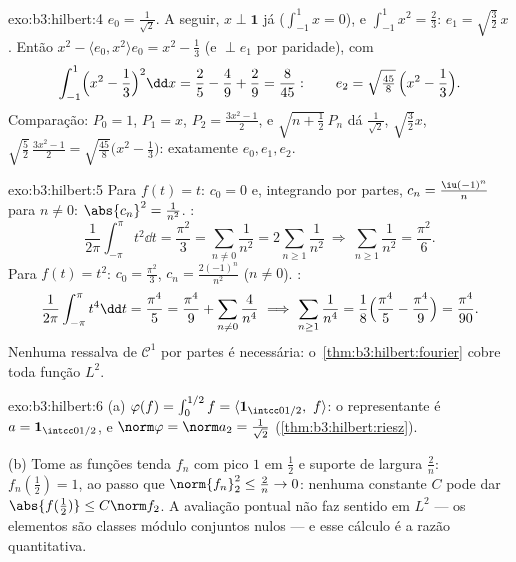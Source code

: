 \begin{solution}{exo:b3:hilbert:4}
$e_0 = \frac1{\sqrt2}$. A seguir, $x \perp \mathbf 1$ já
($\int_{-1}^1x = 0$), e $\int_{-1}^1x^2 = \frac23$: $e_1 =
\sqrt{\tfrac32}\,x$. Então $x^2 - \langle e_0, x^2\rangle e_0 =
x^2 - \frac13$ (e $\perp e_1$ por paridade), com
\[
\int_{-1}^1\Bigl(x^2 - \frac13\Bigr)^2\dd x = \frac25 -
\frac49 + \frac29 = \frac{8}{45}:
\qquad e_2 = \sqrt{\tfrac{45}8}\,\Bigl(x^2 - \frac13\Bigr).
\]
Comparação: $P_0 = 1$, $P_1 = x$, $P_2 = \frac{3x^2 - 1}2$, e
$\sqrt{n + \tfrac12}\,P_n$ dá $\frac1{\sqrt2}$,
$\sqrt{\frac32}x$, $\sqrt{\frac52}\,\frac{3x^2-1}2 =
\sqrt{\frac{45}8}\bigl(x^2 - \frac13\bigr)$: exatamente $e_0, e_1,
e_2$.
\end{solution}

\begin{solution}{exo:b3:hilbert:5}
Para $f(t) = t$: $c_0 = 0$ e, integrando por partes, $c_n =
\frac{\iu(-1)^n}{n}$ para $n \neq 0$: $\abs{c_n}^2 =
\frac1{n^2}$. :
\[
\frac1{2\pi}\int_{-\pi}^\pi t^2\dd t = \frac{\pi^2}3
= \sum_{n\neq0}\frac1{n^2} = 2\sum_{n\geq1}\frac1{n^2}
\ \Longrightarrow\ \sum_{n\geq1}\frac1{n^2} = \frac{\pi^2}6 .
\]
Para $f(t) = t^2$: $c_0 = \frac{\pi^2}3$, $c_n =
\frac{2(-1)^n}{n^2}$ ($n \ne 0$). :
\[
\frac1{2\pi}\int_{-\pi}^{\pi}t^4\dd t = \frac{\pi^4}5
= \frac{\pi^4}9 + \sum_{n\neq0}\frac4{n^4}
\ \Longrightarrow\
\sum_{n\geq1}\frac1{n^4} = \frac18\Bigl(\frac{\pi^4}5 -
\frac{\pi^4}9\Bigr) = \frac{\pi^4}{90} .
\]
Nenhuma ressalva de $\mathcal C^1$ por partes é necessária:
o~\cref{thm:b3:hilbert:fourier} cobre toda função $L^2$.
\end{solution}

\begin{solution}{exo:b3:hilbert:6}
(a) $\varphi(f) = \int_0^{1/2}f = \langle\mathbf
1_{\intcc0{1/2}},\ f\rangle$: o representante é $a =
\mathbf 1_{\intcc0{1/2}}$, e $\norm\varphi = \norm a_2 =
\frac1{\sqrt2}$ (\cref{thm:b3:hilbert:riesz}).

(b) Tome as funções tenda $f_n$ com pico $1$ em
$\frac12$ e suporte de largura $\frac2n$: $f_n(\tfrac12) = 1$,
ao passo que $\norm{f_n}_2^2 \leq \frac2n \to 0$: nenhuma constante $C$
pode dar $\abs{f(\frac12)} \leq C\norm f_2$. A avaliação pontual
não faz sentido em $L^2$ --- os elementos são classes módulo conjuntos
nulos --- e esse cálculo é a razão quantitativa.
\end{solution}

